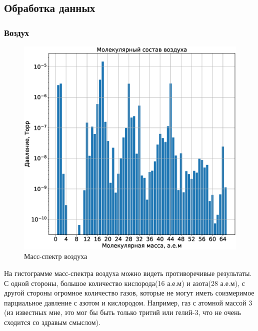 \documentclass[a4paper,14pt]{extarticle}
\begin{document}
		\subsection{Обработка данных}
			\subsubsection{Воздух}
				\begin{figure}[h!]
					\centering
					\includegraphics[width=.75\linewidth]{Lab2_1.eps}
					\caption{Масс-спектр воздуха}
					\label{fig4}
				\end{figure}
				
				На гистограмме масс-спектра воздуха можно видеть противоречивые результаты. С одной стороны, большое количество кислорода(16 а.е.м) и азота(28 а.е.м), с другой стороны огромное количество газов, которые не могут иметь соизмеримое парциальное давление с азотом и кислородом. Например, газ с атомной массой 3 (из известных мне, это мог бы быть только тритий или гелий-3, что не очень сходится со здравым смыслом).
\end{document}

